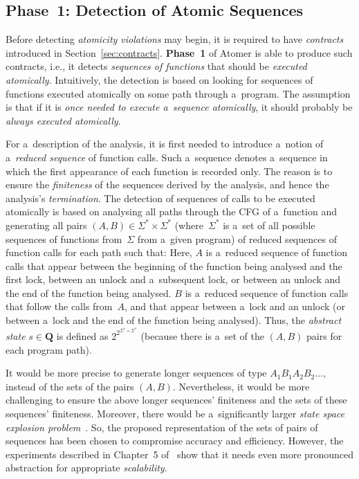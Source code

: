 \subsection{Phase~1: Detection of Atomic Sequences}

Before detecting \emph{atomicity violations} may begin, it is required to have
\emph{contracts} introduced in Section~\ref{sec:contracts}. \textbf{Phase~1}
of Atomer is able to produce such contracts, i.e., it detects \emph{sequences
of functions} that should be \emph{executed atomically}. Intuitively, the
detection is based on looking for sequences of functions executed atomically
on some path through a~program. The assumption is that if it is \emph{once
needed to execute a~sequence atomically}, it should probably be \emph{always
executed atomically}.

For a~description of the analysis, it is first needed to introduce a~notion
of a~\emph{reduced sequence} of function calls. Such a~sequence denotes
a~sequence in which the first appearance of each function is recorded only.
The reason is to ensure the \emph{finiteness} of the sequences derived by the
analysis, and hence the analysis's \emph{termination}. The detection of
sequences of calls to be executed atomically is based on analysing all paths
through the CFG of a~function and generating all pairs $ {(A, B)} \in
{\Sigma^* \times \Sigma^*} $ (where~$ \Sigma^* $ is a~set of all possible
sequences of functions from~$ \Sigma $ from a~given program) of reduced
sequences of function calls for each path such
that: Here, $ A $ is a~reduced sequence of function calls that appear between
the beginning of the function being analysed and the first lock, between an
unlock and a~subsequent lock, or between an unlock and the end of the function
being analysed. $ B $ is a~reduced sequence of function calls that follow the
calls from~$ A $, and that appear between a~lock and an unlock (or between
a~lock and the end of the function being analysed). Thus, the \emph{abstract
state} $ s \in \boldsymbol{Q} $ is defined as $ 2^{2^{\Sigma^* \times
\Sigma^*}} $ (because there is a~set of the ${ (A, B) }$ pairs for each program
path).

It would be more precise to generate longer sequences of type ${ A_1 B_1 A_2
B_2 \ldots }$, instead of the sets of the pairs ${ (A, B) }$. Nevertheless,
it would be more challenging to ensure the above longer sequences' finiteness
and the sets of these sequences' finiteness. Moreover, there would be
a~significantly larger \emph{state space explosion problem}~\cite{stateExpl}.
So, the proposed representation of the sets of pairs of sequences has been
chosen to compromise accuracy and efficiency. However, the experiments
described in Chapter~5 of~\cite{harmimBP} show that it needs even more
pronounced abstraction for appropriate \emph{scalability}.

